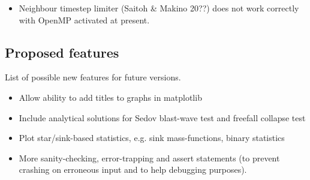 \documentclass[a4paper]{article}
\begin{document}
\begin{itemize}
\item Neighbour timestep limiter (Saitoh \& Makino 20??) does not work correctly with OpenMP activated at present.
\end{itemize}


\subsection{Proposed features}
List of possible new features for future versions.

\begin{itemize}
\item Allow ability to add titles to graphs in matplotlib
\item Include analytical solutions for Sedov blast-wave test and freefall collapse test
\item Plot star/sink-based statistics, e.g. sink mass-functions, binary statistics
\item More sanity-checking, error-trapping and assert statements (to prevent crashing on erroneous input and to help debugging purposes).
\end{itemize}
\end{document}
